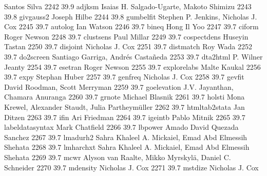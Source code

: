                                    Santos Silva                            
  2242     39.9    adjksm        Isaias H. Salgado-Ugarte, Makoto Shimizu
  2243     39.8    givgauss2     Joseph Hilbe                            
  2244     39.8    gumbelfit     Stephen P. Jenkins, Nicholas J. Cox     
  2245     39.7    autolog       Ian Watson                              
  2246     39.7    bineq         Hong Il Yoo                             
  2247     39.7    ciform        Roger Newson                            
  2248     39.7    clustsens     Paul Millar                             
  2249     39.7    cospectdens   Huseyin Tastan                          
  2250     39.7    disjoint      Nicholas J. Cox                         
  2251     39.7    distmatch     Roy Wada                                
  2252     39.7    do2screen     Santiago Garriga, Andrés Castañeda    
  2253     39.7    dta2html      P. Wilner Jeanty                        
  2254     39.7    esetran       Roger Newson                            
  2255     39.7    explorelabs   Malte Kaukal                            
  2256     39.7    expy          Stephan Huber                           
  2257     39.7    genfreq       Nicholas J. Cox                         
  2258     39.7    gevfit        David Roodman, Scott Merryman           
  2259     39.7    goelevation   J.V. Jayanthan, Chamara Anuranga        
  2260     39.7    grnote        Michael Blasnik                         
  2261     39.7    holsti        Mona Krewel, Alexander Staudt, Julia    
                                   Partheymüller                          
  2262     39.7    htmltab2stata  Jan Ditzen                              
  2263     39.7    ifin          Ari Friedman                            
  2264     39.7    igeintb       Pablo Mitnik                            
  2265     39.7    labeldatasyntax  Mark Chatfield                          
  2266     39.7    lbpower       Amado David Quezada Sanchez             
  2267     39.7    lmadurh2      Sahra Khaleel A. Mickaiel, Emad Abd     
                                   Elmessih Shehata                        
  2268     39.7    lmharchxt     Sahra Khaleel A. Mickaiel, Emad Abd     
                                   Elmessih Shehata                        
  2269     39.7    mcwr          Alyson van Raalte, Mikko Myrskylä,     
                                   Daniel C. Schneider                     
  2270     39.7    mdensity      Nicholas J. Cox                         
  2271     39.7    mstdize       Nicholas J. Cox                         
